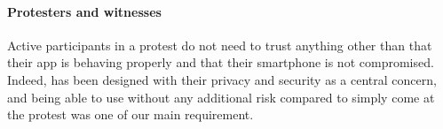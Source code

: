 \paragraph{Protesters and witnesses} Active participants in a protest do not need to trust anything other than that their app is behaving properly and that their smartphone is not compromised. Indeed, \CROCUS has been designed with their privacy and security as a central concern, and being able to use \CROCUS without any additional risk compared to simply come at the protest was one of our main requirement.